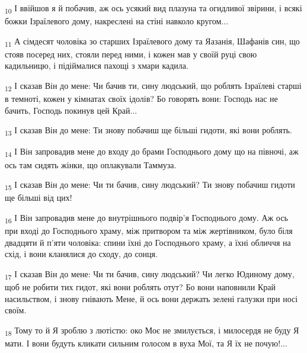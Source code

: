 \begin{tcolorbox}
\textsubscript{10} І ввійшов я й побачив, аж ось усякий вид плазуна та огидливої звірини, і всякі божки Ізраїлевого дому, накреслені на стіні навколо кругом...
\end{tcolorbox}
\begin{tcolorbox}
\textsubscript{11} А сімдесят чоловіка зо старших Ізраїлевого дому та Яазанія, Шафанів син, що стояв посеред них, стояли перед ними, і кожен мав у своїй руці свою кадильницю, і підіймалися пахощі з хмари кадила.
\end{tcolorbox}
\begin{tcolorbox}
\textsubscript{12} І сказав Він до мене: Чи бачив ти, сину людський, що роблять Ізраїлеві старші в темноті, кожен у кімнатах своїх ідолів? Бо говорять вони: Господь нас не бачить, Господь покинув цей Край...
\end{tcolorbox}
\begin{tcolorbox}
\textsubscript{13} І сказав Він до мене: Ти знову побачиш ще більші гидоти, які вони роблять.
\end{tcolorbox}
\begin{tcolorbox}
\textsubscript{14} І Він запровадив мене до входу до брами Господнього дому що на півночі, аж ось там сидять жінки, що оплакували Таммуза.
\end{tcolorbox}
\begin{tcolorbox}
\textsubscript{15} І сказав Він до мене: Чи ти бачив, сину людський? Ти знову побачиш гидоти ще більші від цих!
\end{tcolorbox}
\begin{tcolorbox}
\textsubscript{16} І Він запровадив мене до внутрішнього подвір'я Господнього дому. Аж ось при вході до Господнього храму, між притвором та між жертівником, було біля двадцяти й п'яти чоловіка: спини їхні до Господнього храму, а їхні обличчя на схід, і вони кланялися до сходу, до сонця.
\end{tcolorbox}
\begin{tcolorbox}
\textsubscript{17} І сказав Він до мене: Чи ти бачив, сину людський? Чи легко Юдиному дому, щоб не робити тих гидот, які вони роблять отут? Бо вони наповнили Край насильством, і знову гнівають Мене, й ось вони держать зелені галузки при носі своїм.
\end{tcolorbox}
\begin{tcolorbox}
\textsubscript{18} Тому то й Я зроблю з лютістю: око Моє не змилується, і милосердя не буду Я мати. І вони будуть кликати сильним голосом в вуха Мої, та Я їх не почую!...
\end{tcolorbox}

